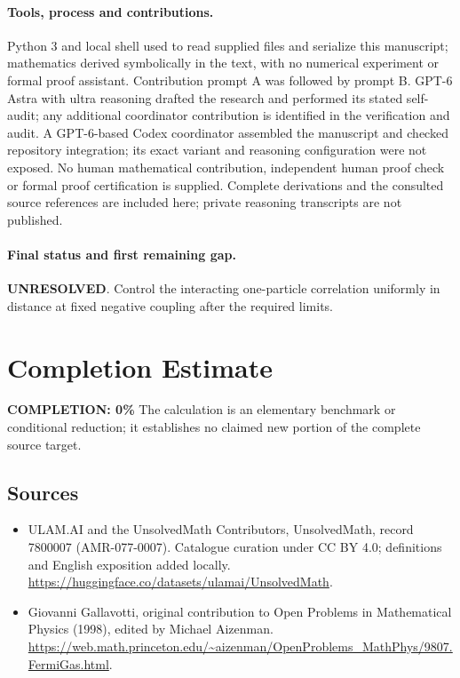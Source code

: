 \documentclass[11pt]{article}
\begin{document}
\paragraph{Tools, process and contributions.}
Python 3 and local shell used to read supplied files and serialize this manuscript; mathematics derived symbolically in the text, with no numerical experiment or formal proof assistant. Contribution prompt A was followed by prompt B. GPT-6 Astra with ultra reasoning drafted the research and performed its stated self-audit; any additional coordinator contribution is identified in the verification and audit. A GPT-6-based Codex coordinator assembled the manuscript and checked repository integration; its exact variant and reasoning configuration were not exposed. No human mathematical contribution, independent human proof check or formal proof certification is supplied. Complete derivations and the consulted source references are included here; private reasoning transcripts are not published.

\paragraph{Final status and first remaining gap.}
\textbf{UNRESOLVED}. Control the interacting one-particle correlation uniformly in distance at fixed negative coupling after the required limits.

\section{Completion Estimate}
\noindent\textbf{COMPLETION: 0\%}
The calculation is an elementary benchmark or conditional reduction; it establishes no claimed new portion of the complete source target.

\subsection{Sources}
\begin{itemize}
\item[\hypertarget{source:7800007:1}{S1}] ULAM.AI and the UnsolvedMath Contributors, UnsolvedMath, record 7800007 (AMR-077-0007). Catalogue curation under CC BY 4.0; definitions and English exposition added locally.
\url{https://huggingface.co/datasets/ulamai/UnsolvedMath}.
\item[\hypertarget{source:7800007:2}{S2}] Giovanni Gallavotti, original contribution to Open Problems in Mathematical Physics (1998), edited by Michael Aizenman.
\url{https://web.math.princeton.edu/~aizenman/OpenProblems_MathPhys/9807.FermiGas.html}.
\end{itemize}
\label{end:7800007}
\end{document}

